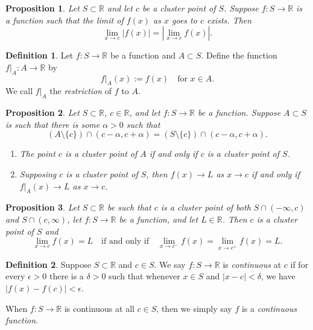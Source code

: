 \documentclass{article}
\newtheorem{proposition}{Proposition}[section]
\theoremstyle{definition}
\newtheorem{definition}{Definition}[section]
\theoremstyle{remark}
\begin{document}
\vspace{.5cm}

\begin{proposition}
Let $S \subset \mathbb{R}$ and let $c$ be a cluster point of $S$. Suppose $f : S \to \mathbb{R}$ is a function such that the limit of $f(x)$ as $x$ goes to $c$ exists. Then
\[
\lim_{x\to c} |f(x)| = \left| \lim_{x\to c} f(x) \right|.
\]
\end{proposition}


\vspace{.5cm}
\begin{definition}
Let $f : S \to \mathbb{R}$ be a function and $A \subset S$. Define the function $f|_A : A \to \mathbb{R}$ by
\[
f|_A(x) := f(x) \quad \text{for } x \in A.
\]
We call $f|_A$ the \textit{restriction} of $f$ to $A$.
\end{definition}


\vspace{.5cm}
\begin{proposition}
Let $S \subset \mathbb{R}$, $c \in \mathbb{R}$, and let $f : S \to \mathbb{R}$ be a function. Suppose $A \subset S$ is such that there is some $\alpha > 0$ such that
\[
(A \setminus \{c\}) \cap (c - \alpha, c + \alpha) = (S \setminus \{c\}) \cap (c - \alpha, c + \alpha).
\]
\begin{enumerate}
\item The point $c$ is a cluster point of $A$ if and only if $c$ is a cluster point of $S$.
\item Supposing $c$ is a cluster point of $S$, then $f(x) \to L$ as $x \to c$ if and only if $f|_A(x) \to L$ as $x \to c$.
\end{enumerate}
\end{proposition}


\vspace{.5cm}
\begin{proposition}
Let $S \subset \mathbb{R}$ be such that $c$ is a cluster point of both $S \cap (-\infty, c)$ and $S \cap (c, \infty)$, let $f : S \to \mathbb{R}$ be a function, and let $L \in \mathbb{R}$. Then $c$ is a cluster point of $S$ and
\[
\lim_{x\to c} f(x) = L \quad \text{if and only if} \quad \lim_{x\to c^-} f(x) = \lim_{x\to c^+} f(x) = L.
\]
\end{proposition}


\vspace{.5cm}
\begin{definition}
Suppose $S \subset \mathbb{R}$ and $c \in S$. We say $f : S \to \mathbb{R}$ is \textit{continuous} at $c$ if for every $\epsilon > 0$ there is a $\delta > 0$ such that whenever $x \in S$ and $|x - c| < \delta$, we have $|f(x) - f(c)| < \epsilon$.

When $f : S \to \mathbb{R}$ is continuous at all $c \in S$, then we simply say $f$ is a \textit{continuous function}.
\end{definition}
\end{document}
